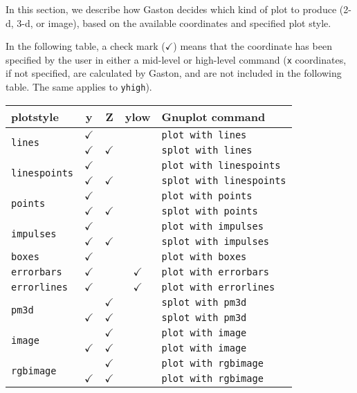 \documentclass[11pt]{article}
\newcommand{\cm}{$\checkmark$}
\newcommand{\cmd}[1]{\texttt{#1}}
\begin{document}
In this section, we describe how Gaston decides which kind of plot to produce
(2-d, 3-d, or image), based on the available coordinates and specified plot
style.

In the following table, a check mark (\cm) means that the coordinate has been
specified by the user in either a mid-level or high-level command (\cmd{x}
coordinates, if not specified, are calculated by Gaston, and are not included
in the following table. The same applies to \cmd{yhigh}).

{\small
\begin{center}
	\begin{tabular}{lcccl}
	\toprule
	\textbf{plotstyle} & \textbf{y} & \textbf{Z} & \textbf{ylow} &
	\textbf{Gnuplot command} \\
	\midrule
	\multirow{2}{*}{\cmd{lines}}
	& \cm &     &  & \cmd{plot with lines} \\
	& \cm & \cm &  & \cmd{splot with lines} \\
	\cmidrule(r){2-5}
	\multirow{2}{*}{\cmd{linespoints}}
	& \cm &     &  & \cmd{plot with linespoints} \\
	& \cm & \cm &  & \cmd{splot with linespoints} \\
	\cmidrule(r){2-5}
	\multirow{2}{*}{\cmd{points}}
	& \cm &     &  & \cmd{plot with points} \\
	& \cm & \cm &  & \cmd{splot with points} \\
	\cmidrule(r){2-5}
	\multirow{2}{*}{\cmd{impulses}}
	& \cm &     &  & \cmd{plot with impulses} \\
	& \cm & \cm &  & \cmd{splot with impulses} \\
	\cmidrule(r){2-5}
	\cmd{boxes}       & \cm &  &     & \cmd{plot with boxes} \\
	\cmd{errorbars}   & \cm &  & \cm & \cmd{plot with errorbars} \\
	\cmd{errorlines}  & \cm &  & \cm & \cmd{plot with errorlines} \\
	\cmidrule(r){2-5}
	\multirow{2}{*}{\cmd{pm3d}}
	&     & \cm &  & \cmd{splot with pm3d} \\
	& \cm & \cm &  & \cmd{splot with pm3d} \\
	\cmidrule(r){2-5}
	\multirow{2}{*}{\cmd{image}}
	&     & \cm &  & \cmd{plot with image} \\
	& \cm & \cm &  & \cmd{plot with image} \\
	\cmidrule(r){2-5}
	\multirow{2}{*}{\cmd{rgbimage}}
	&     & \cm &  & \cmd{plot with rgbimage} \\
	& \cm & \cm &  & \cmd{plot with rgbimage} \\
	\bottomrule
\end{tabular}
\end{center}}
\end{document}
